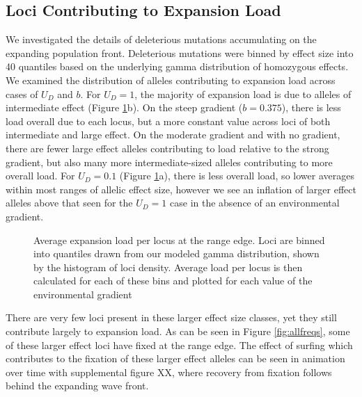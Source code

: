 \subsection*{Loci Contributing to Expansion Load}
We investigated the details of deleterious mutations accumulating on the expanding population front. Deleterious mutations were binned by effect size into 40 quantiles based on the underlying gamma distribution of homozygous effects. We examined the distribution of alleles contributing to expansion load across cases of $U_D$ and $b$. For $U_D = 1$, the majority of expansion load is due to alleles of intermediate effect (Figure \ref{fig:loci}b). On the steep gradient ($b = 0.375$), there is less load overall due to each locus, but a more constant value across loci of both intermediate and large effect. On the moderate gradient and with no gradient, there are fewer large effect alleles contributing to load relative to the strong gradient, but also many more intermediate-sized alleles contributing to more overall load. For $U_D = 0.1$ (Figure \ref{fig:loci}a), there is less overall load, so lower averages within most ranges of allelic effect size, however we see an inflation of larger effect alleles above that seen for the $U_D= 1$ case in the absence of an environmental gradient.

\begin{figure}[H]
\centering
{}
\caption[Average expansion load per locus.]{Average expansion load per locus at the range edge. Loci are binned into quantiles drawn from our modeled gamma distribution, shown by the histogram of loci density. Average load per locus is then calculated for each of these bins and plotted for each value of the environmental gradient}
\label{fig:loci}
\end{figure}

There are very few loci present in these larger effect size classes, yet they still contribute largely to expansion load. As can be seen in Figure \ref{fig:allfreqs}, some of these larger effect loci have fixed at the range edge. The effect of surfing which contributes to the fixation of these larger effect alleles can be seen in animation over time with supplemental figure \color{red}XX\color{black}, where recovery from fixation follows behind the expanding wave front.

